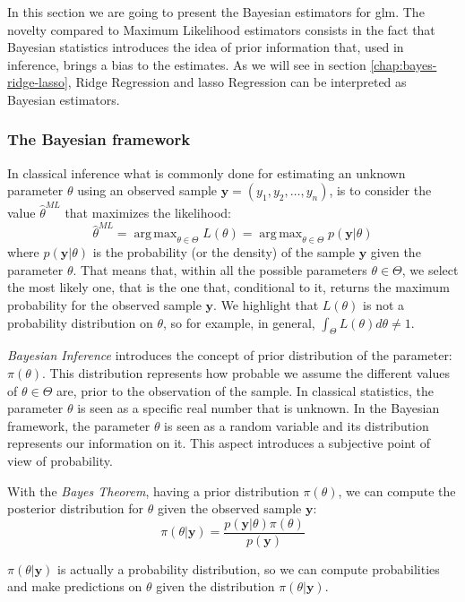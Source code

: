 \documentclass[a4paper, twoside, openright, 12pt]{report}
\DeclareMathOperator*{\argmax}{arg\,max}  %
\theoremstyle{definition}
\theoremstyle{definition}
\theoremstyle{definition}
\theoremstyle{remark}
\begin{document}
In this section we are going to present the Bayesian estimators for \ac{glm}. The novelty compared to Maximum Likelihood estimators consists in the fact that Bayesian statistics introduces the idea of prior information that, used in inference, brings a bias to the estimates. As we will see in section \ref{chap:bayes-ridge-lasso}, Ridge Regression and \ac{lasso} Regression can be interpreted as Bayesian estimators.

\hypertarget{the-bayesian-framework}{%
\subsubsection{The Bayesian framework}\label{the-bayesian-framework}}

In classical inference what is commonly done for estimating an unknown parameter \(\theta\) using an observed sample \(\boldsymbol{y}=(y_1, y_2, \dots, y_n)\), is to consider the value \(\hat{\theta}^{ML}\) that maximizes the likelihood:
\[
\hat{\theta}^{ML} = \argmax_{\theta\in\Theta}{L(\theta)} = \argmax_{\theta\in\Theta}{p(\boldsymbol{y}|\theta)}
\]
where \(p(\boldsymbol{y}|\theta)\) is the probability (or the density) of the sample \(\boldsymbol{y}\) given the parameter \(\theta\). That means that, within all the possible parameters \(\theta\in\Theta\), we select the most likely one, that is the one that, conditional to it, returns the maximum probability for the observed sample \(\boldsymbol{y}\). We highlight that \(L(\theta)\) is not a probability distribution on \(\theta\), so for example, in general, \(\int_{\Theta}{L(\theta)d\theta}\ne1\).

\emph{Bayesian Inference} introduces the concept of prior distribution of the parameter: \(\pi(\theta)\). This distribution represents how probable we assume the different values of \(\theta\in\Theta\) are, prior to the observation of the sample. In classical statistics, the parameter \(\theta\) is seen as a specific real number that is unknown. In the Bayesian framework, the parameter \(\theta\) is seen as a random variable and its distribution represents our information on it. This aspect introduces a subjective point of view of probability.

With the \emph{Bayes Theorem}, having a prior distribution \(\pi(\theta)\), we can compute the posterior distribution for \(\theta\) given the observed sample \(\boldsymbol{y}\):
\[
\pi(\theta|\boldsymbol{y}) = \frac{p(\boldsymbol{y}|\theta)\pi(\theta)}{p(\boldsymbol{y})}
\]

\(\pi(\theta|\boldsymbol{y})\) is actually a probability distribution, so we can compute probabilities and make predictions on \(\theta\) given the distribution \(\pi(\theta|\boldsymbol{y})\).
\end{document}
